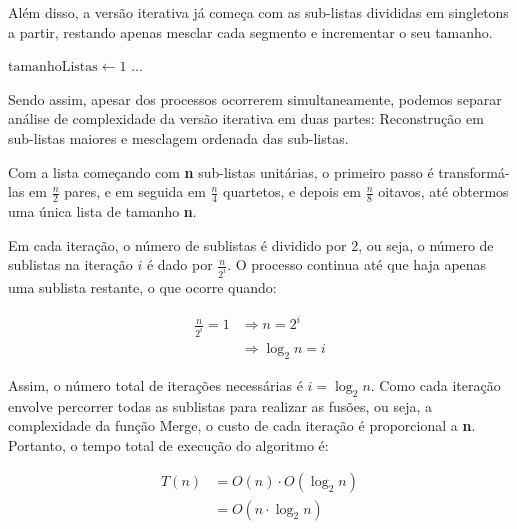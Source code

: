 \begin{algorithm}
	\begin{algorithmic}[0]

		\EndFor
		\EndFor
	\end{algorithmic}
\end{algorithm}
\FloatBarrier

Além disso, a versão iterativa já começa com as sub-listas divididas em singletons a partir, restando apenas mesclar cada segmento e incrementar o seu tamanho.

\begin{algorithm}
	\begin{algorithmic}[0]
		\State $\text{tamanhoListas} \gets 1$
		\State ...
		\EndWhile
	\end{algorithmic}
\end{algorithm}

Sendo assim, apesar dos processos ocorrerem simultaneamente, podemos separar análise de complexidade da versão iterativa em duas partes: Reconstrução em sub-listas maiores e mesclagem ordenada das sub-listas.

Com a lista começando com \textbf{n} sub-listas unitárias, o primeiro passo é transformá-las em \textbf{$\frac{n}{2}$} pares, e em seguida em \textbf{$\frac{n}{4}$} quartetos, e depois em \textbf{$\frac{n}{8}$} oitavos, até obtermos uma única lista de tamanho \textbf{n}. 

Em cada iteração, o número de sublistas é dividido por 2, ou seja, o número de sublistas na iteração $i$ é dado por $\frac{n}{2^i}$. O processo continua até que haja apenas uma sublista restante, o que ocorre quando:

\begin{align*}
  \frac{n}{2^i} = 1 &\Longrightarrow n = 2^i \\
                    &\Longrightarrow \log_2 n = i
\end{align*}

Assim, o número total de iterações necessárias é $i = \log_2 n$. Como cada iteração envolve percorrer todas as sublistas para realizar as fusões, ou seja, a complexidade da função Merge, o custo de cada iteração é proporcional a \textbf{n}. Portanto, o tempo total de execução do algoritmo é:

\begin{align*}
	T(n) & = O(n) \cdot O(\log_2{n}) \\
	     & = O(n \cdot \log_2{n})
\end{align*}

